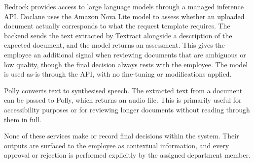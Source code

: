 \par Bedrock provides access to large language models through a managed inference API. Doclane uses the Amazon Nova Lite model to assess whether an uploaded document actually corresponds to what the request template requires. The backend sends the text extracted by Textract alongside a description of the expected document, and the model returns an assessment. This gives the employee an additional signal when reviewing documents that are ambiguous or low quality, though the final decision always rests with the employee. The model is used as-is through the API, with no fine-tuning or modifications applied.

\par Polly converts text to synthesised speech. The extracted text from a document can be passed to Polly, which returns an audio file. This is primarily useful for accessibility purposes or for reviewing longer documents without reading through them in full.

\par None of these services make or record final decisions within the system. Their outputs are surfaced to the employee as contextual information, and every approval or rejection is performed explicitly by the assigned department member.